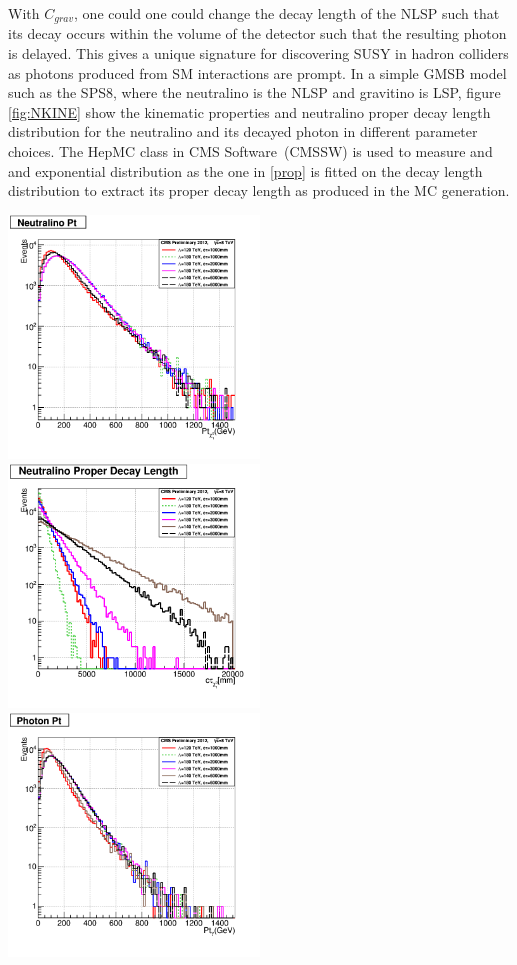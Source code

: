 {With $C_{grav}$, one could  one could change the decay length of the NLSP such that its decay occurs within the volume of the detector such that the resulting photon is delayed. This gives a unique signature for discovering SUSY in hadron colliders as photons produced from SM interactions are prompt.
In a simple GMSB model such as the SPS8, where the neutralino is the NLSP and gravitino is LSP, figure \ref{fig:NKINE} show the kinematic properties and neutralino proper decay length distribution for the neutralino and its decayed photon in different  parameter choices. The HepMC class in CMS Software~(CMSSW) is used to measure and and exponential distribution as the one in \eqref{prop} is fitted on the decay length distribution to extract its proper decay length as produced in the MC generation.
\begin{center}
\centering
\mbox{\includegraphics[height=0.5\textwidth,width=0.5\textwidth]{THESISPLOTS/GMSB-SPS8-MODEL-Neutralinio-Pt.png} \hspace{-1cm}
\includegraphics[height=0.5\textwidth,width=0.5\textwidth]{THESISPLOTS/GMSB-SPS8-MODEL-Neutralino-Proper-DecayLength.png}} \\
\hspace{0.5cm}
\mbox{\includegraphics[height=0.5\textwidth,width=0.5\textwidth]{THESISPLOTS/GMSB-SPS8-MODEL-Photon-Pt.png} \hspace{-1cm}
}
\end{center}}
